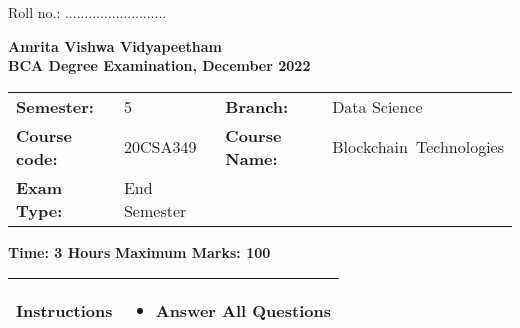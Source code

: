 \documentclass[12pt,a4paper]{article}
\author{Jinesh M.K}
\begin{document}
\begin{flushright}
Roll no.: ..........................
\end{flushright}
\begin{center}
{\bf Amrita Vishwa Vidyapeetham}\\

{\bf BCA Degree Examination, December 2022}\\



\end{center}


\begin{table}[h!]
\begin{tabular}{p{}p{}p{}p{}}

\textbf{Semester:}    &            5      & \textbf{Branch:}       &Data Science   \\ 
\textbf{Course code:} & 20CSA349        & \textbf{Course Name:}    & Blockchain Technologies \\ 
\textbf{Exam Type:}    & End  Semester& \textbf{}               &  \\ 

\end{tabular}
\end{table}
\textbf{Time: 3 Hours} \hfill \textbf{Maximum Marks: 100}

\begin{table}[h!]
\begin{tabular}{|p{}|p{}|}
\hline

\textbf{Instructions} & \vspace*{-1em} \begin{itemize}
\item Answer All Questions
\end{itemize}
 \\
\hline
\end{tabular}
\end{table}
\end{document}
